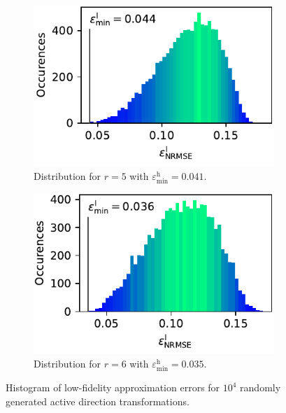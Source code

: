 \documentclass[
  a4paper,  %
  twoside,  %
  bibliography=totoc,
  headsepline,
  cleardoublepage=empty,
  parskip=half,
  draft=false
]{scrbook}
\begin{document}
\begin{mdframed}[style=style]
\begin{figure}[H]
\vspace{3mm}
\begin{subfigure}{.5\textwidth}
  \centering
   \includegraphics[width=0.95\linewidth]{graphics/ww_hist_5}
  \caption{Distribution for $r=5$ with $\varepsilon^\mathrm{h}_{\mathrm{min}}=0.041$.}
\vspace{3mm}
\label{fig:ishigami_hist_2}
\end{subfigure}%
\begin{subfigure}{.5\textwidth}
  \centering
   \includegraphics[width=0.95\linewidth]{graphics/ww_hist_6}
  \caption{Distribution for $r=6$ with $\varepsilon^\mathrm{h}_{\mathrm{min}}=0.035$.}
\vspace{3mm}
\label{fig:ishigami_hist_1}
\end{subfigure}
\delimit
\caption{Histogram of low-fidelity approximation errors for $10^4$ randomly generated active direction transformations.}
\label{fig:ww_hist_all}
\end{figure}
\end{mdframed}
\end{document}
